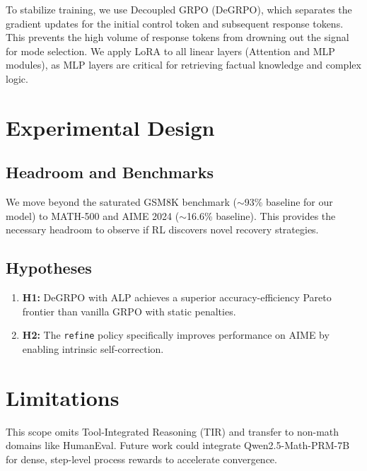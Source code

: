 \documentclass{article}
\begin{document}
To stabilize training, we use Decoupled GRPO (DeGRPO), which separates the gradient updates for the initial control token and subsequent response tokens.
This prevents the high volume of response tokens from drowning out the signal for mode selection.
We apply LoRA to all linear layers (Attention and MLP modules), as MLP layers are critical for retrieving factual knowledge and complex logic.

\section{Experimental Design}

\subsection{Headroom and Benchmarks}

We move beyond the saturated GSM8K benchmark ($\sim$93\% baseline for our model) to MATH-500 and AIME 2024 ($\sim$16.6\% baseline).
This provides the necessary headroom to observe if RL discovers novel recovery strategies.

\subsection{Hypotheses}

\begin{enumerate}
  \item \textbf{H1:} DeGRPO with ALP achieves a superior accuracy-efficiency Pareto frontier than vanilla GRPO with static penalties.
  \item \textbf{H2:} The \texttt{refine} policy specifically improves performance on AIME by enabling intrinsic self-correction.
\end{enumerate}

\section{Limitations}

This scope omits Tool-Integrated Reasoning (TIR) and transfer to non-math domains like HumanEval.
Future work could integrate Qwen2.5-Math-PRM-7B for dense, step-level process rewards to accelerate convergence.



\end{document}

